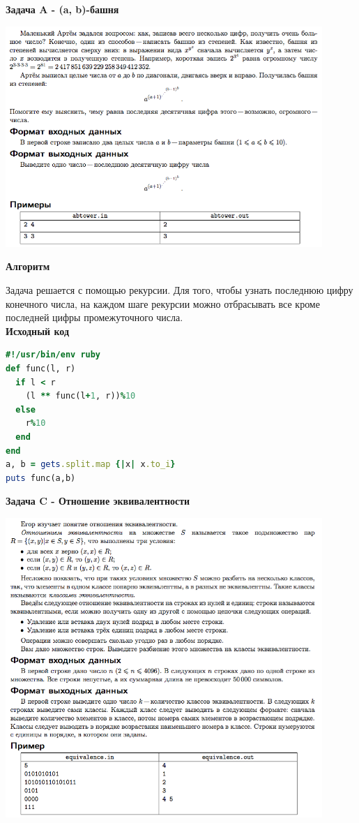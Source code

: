 \documentclass[a4paper,12pt]{article}
\begin{document}
\newpage
\textbf{{\large Задача A - (a, b)-башня}}

\begin{center}
\includegraphics[width=0.9\textwidth]{OC_Peterhof/A.png}\\ [1cm]
\end{center}

\textbf{{\large Алгоритм}}

Задача решается с помощью рекурсии. Для того, чтобы узнать последнюю цифру конечного числа, на каждом шаге рекурсии можно отбрасывать все кроме последней цифры промежуточного числа. \\

\textbf{{\large Исходный код}} \\
\begin{lstlisting}[language=Ruby]
#!/usr/bin/env ruby
def func(l, r)
  if l < r
    (l ** func(l+1, r))%10
  else
    r%10
  end
end
a, b = gets.split.map {|x| x.to_i}
puts func(a,b)

\end{lstlisting}


\newpage
\textbf{{\large Задача C - Отношение эквивалентности}}

\begin{center}
\includegraphics[width=0.9\textwidth]{OC_Peterhof/C.png}\\ [1cm]
\end{center}
\end{document}
